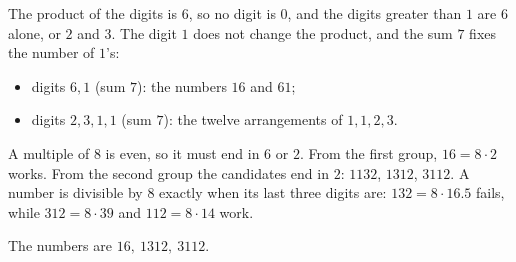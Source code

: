 The product of the digits is $6$, so no digit is $0$, and the digits greater than $1$ are $6$ alone, or $2$ and $3$. The digit $1$ does not change the product, and the sum $7$ fixes the number of $1$'s:
\begin{itemize}
\item digits $6,1$ (sum $7$): the numbers $16$ and $61$;
\item digits $2,3,1,1$ (sum $7$): the twelve arrangements of $1,1,2,3$.
\end{itemize}
A multiple of $8$ is even, so it must end in $6$ or $2$. From the first group, $16=8\cdot2$ works. From the second group the candidates end in $2$: $1132$, $1312$, $3112$. A number is divisible by $8$ exactly when its last three digits are: $132=8\cdot16.5$ fails, while $312=8\cdot39$ and $112=8\cdot14$ work.

The numbers are $\boxed{16,\ 1312,\ 3112}$.
